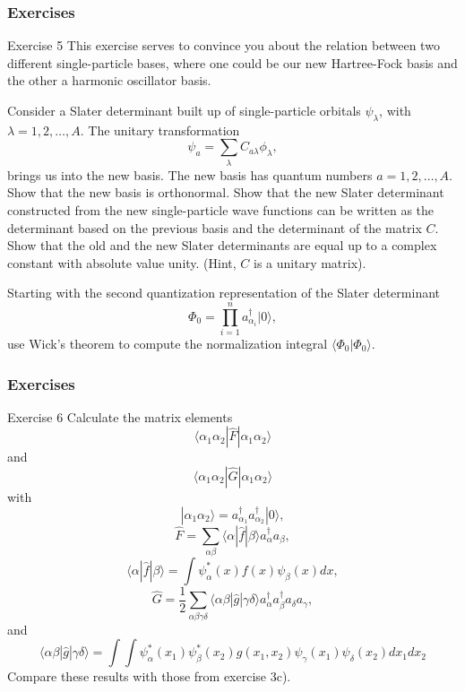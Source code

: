 \documentclass{beamer}
\begin{document}
\begin{frame}
\frametitle{Exercises}

\begin{block}{Exercise 5 }
This exercise serves to convince you about the relation between
two different single-particle bases, where one could be our new Hartree-Fock basis and the other a harmonic oscillator basis.

Consider a Slater determinant built up of single-particle orbitals $\psi_{\lambda}$, 
with $\lambda = 1,2,\dots,A$. The unitary transformation
\[
\psi_a  = \sum_{\lambda} C_{a\lambda}\phi_{\lambda},
\]
brings us into the new basis.  
The new basis has quantum numbers $a=1,2,\dots,A$.
Show that the new basis is orthonormal.
Show that the new Slater determinant constructed from the new single-particle wave functions can be
written as the determinant based on the previous basis and the determinant of the matrix $C$.
Show that the old and the new Slater determinants are equal up to a complex constant with absolute value unity.
(Hint, $C$ is a unitary matrix). 

Starting with the second quantization representation of the Slater determinant 
\[
\Phi_{0}=\prod_{i=1}^{n}a_{\alpha_{i}}^{\dagger}|0\rangle,
\]
use Wick's theorem to compute the normalization integral
$\langle\Phi_{0}|\Phi_{0}\rangle$.
\end{block}
\end{frame}

\begin{frame}
\frametitle{Exercises}

\begin{block}{Exercise 6 }
Calculate the matrix elements
\[
\langle \alpha_{1}\alpha_{2}|\hat{F}|\alpha_{1}\alpha_{2}\rangle
\]
and
\[
\langle \alpha_{1}\alpha_{2}|\hat{G}|\alpha_{1}\alpha_{2}\rangle
\]
with
\[
|\alpha_{1}\alpha_{2}\rangle=a_{\alpha_{1}}^{\dagger}a_{\alpha_{2}}^{\dagger}|0\rangle ,
\]
\[
\hat{F}=\sum_{\alpha\beta}\langle \alpha|\hat{f}|\beta\rangle
a_{\alpha}^{\dagger}a_{\beta}  ,
\]
\[
\langle \alpha|\hat{f}|\beta\rangle=\int \psi_{\alpha}^{*}(x)f(x)\psi_{\beta}(x)dx ,
\]
\[
\hat{G} = \frac{1}{2}\sum_{\alpha\beta\gamma\delta}
\langle \alpha\beta |\hat{g}|\gamma\delta\rangle
a_{\alpha}^{\dagger}a_{\beta}^{\dagger}a_{\delta}a_{\gamma} ,
\]
and
\[
\langle \alpha\beta |\hat{g}|\gamma\delta\rangle=
\int\int \psi_{\alpha}^{*}(x_{1})\psi_{\beta}^{*}(x_{2})g(x_{1},
x_{2})\psi_{\gamma}(x_{1})\psi_{\delta}(x_{2})dx_{1}dx_{2}
\]
Compare these results with those from exercise 3c).
\end{block}
\end{frame}
\end{document}
